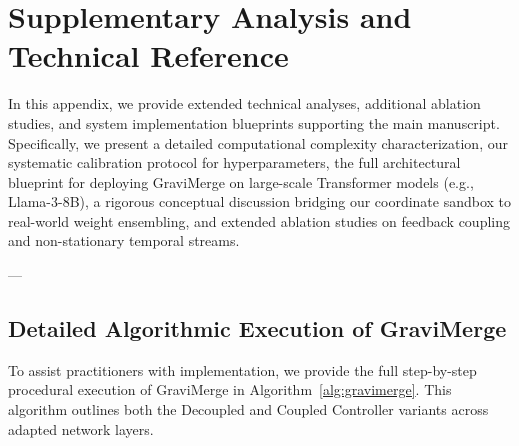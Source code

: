 \section{Supplementary Analysis and Technical Reference}
\label{sec:appendix_technical}

In this appendix, we provide extended technical analyses, additional ablation studies, and system implementation blueprints supporting the main manuscript. Specifically, we present a detailed computational complexity characterization, our systematic calibration protocol for hyperparameters, the full architectural blueprint for deploying GraviMerge on large-scale Transformer models (e.g., Llama-3-8B), a rigorous conceptual discussion bridging our coordinate sandbox to real-world weight ensembling, and extended ablation studies on feedback coupling and non-stationary temporal streams.

---

\subsection{Detailed Algorithmic Execution of GraviMerge}
\label{sec:appendix_algorithm}

To assist practitioners with implementation, we provide the full step-by-step procedural execution of GraviMerge in Algorithm~\ref{alg:gravimerge}. This algorithm outlines both the Decoupled and Coupled Controller variants across adapted network layers.

